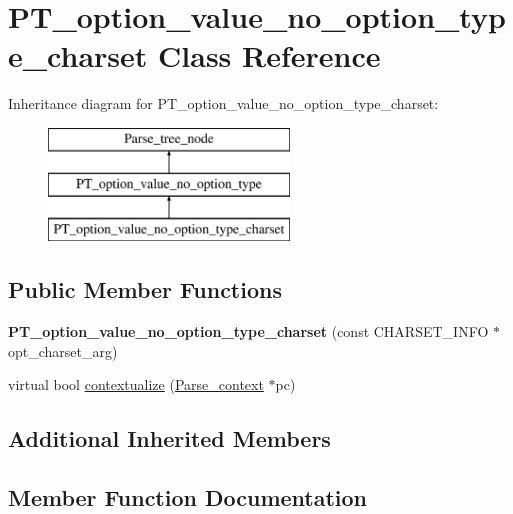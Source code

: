 \hypertarget{classPT__option__value__no__option__type__charset}{}\section{P\+T\+\_\+option\+\_\+value\+\_\+no\+\_\+option\+\_\+type\+\_\+charset Class Reference}
\label{classPT__option__value__no__option__type__charset}
Inheritance diagram for P\+T\+\_\+option\+\_\+value\+\_\+no\+\_\+option\+\_\+type\+\_\+charset\+:\begin{figure}[H]
\begin{center}
\leavevmode
\includegraphics[height=3.000000cm]{classPT__option__value__no__option__type__charset}
\end{center}
\end{figure}
\subsection*{Public Member Functions}
\begin{DoxyCompactItemize}
\item 
\mbox{\label{classPT__option__value__no__option__type__charset_a886bddffed880066afdb0135ffa51412}} 
{\bfseries P\+T\+\_\+option\+\_\+value\+\_\+no\+\_\+option\+\_\+type\+\_\+charset} (const C\+H\+A\+R\+S\+E\+T\+\_\+\+I\+N\+FO $\ast$opt\+\_\+charset\+\_\+arg)
\item 
virtual bool \mbox{\hyperlink{classPT__option__value__no__option__type__charset_a5319e9cc9f8e9bd27b1818eec8681c20}{contextualize}} (\mbox{\hyperlink{structParse__context}{Parse\+\_\+context}} $\ast$pc)
\end{DoxyCompactItemize}
\subsection*{Additional Inherited Members}


\subsection{Member Function Documentation}
\mbox{\label{classPT__option__value__no__option__type__charset_a5319e9cc9f8e9bd27b1818eec8681c20}} 
